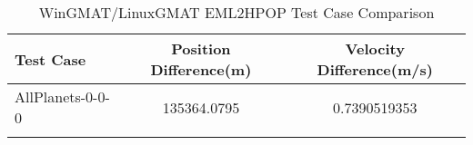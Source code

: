 \begin{table}[htbp!]
\centering
\caption{ WinGMAT/LinuxGMAT EML2HPOP Test Case Comparison}
      \begin{tabular}{lcc}
      \hline\hline
          Test Case & Position Difference(m) & Velocity Difference(m/s) \\
         \hline
         AllPlanets-0-0-0 & 135364.0795 & 0.7390519353 \\
      \hline\hline
      \label{Table: EML2HPOP WinGMAT-LinuxGMAT Table} 
\end{tabular}
\end{table}
